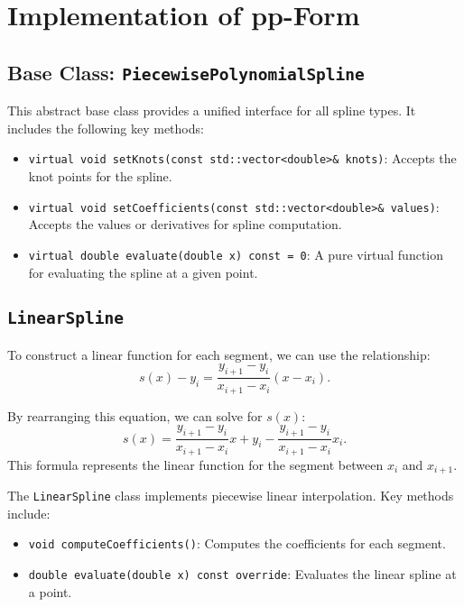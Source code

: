 \documentclass{article}
\begin{document}
\section{Implementation of pp-Form}
\subsection{Base Class: \texttt{PiecewisePolynomialSpline}}
This abstract base class provides a unified interface for all spline types. It includes the following key methods:
\begin{itemize}
    \item \texttt{virtual void setKnots(const std::vector<double>\& knots)}: Accepts the knot points for the spline.
    \item \texttt{virtual void setCoefficients(const std::vector<double>\& values)}: Accepts the values or derivatives for spline computation.
    \item \texttt{virtual double evaluate(double x) const = 0}: A pure virtual function for evaluating the spline at a given point.
\end{itemize}


\subsection{\texttt{LinearSpline}}
To construct a linear function for each segment, we can use the relationship:
\[
s(x) - y_i = \frac{y_{i+1} - y_i}{x_{i+1} - x_i}(x - x_i).
\]

By rearranging this equation, we can solve for \( s(x) \):
\[
s(x) = \frac{y_{i+1} - y_i}{x_{i+1} - x_i} x + y_i - \frac{y_{i+1} - y_i}{x_{i+1} - x_i} x_i.
\]
This formula represents the linear function for the segment between \( x_i \) and \( x_{i+1} \).\par
The \texttt{LinearSpline} class implements piecewise linear interpolation. Key methods include:
\begin{itemize}
    \item \texttt{void computeCoefficients()}: Computes the coefficients for each segment.
    \item \texttt{double evaluate(double x) const override}: Evaluates the linear spline at a point.
\end{itemize}
\end{document}
